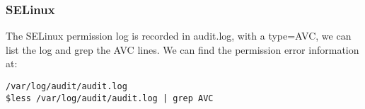 \subsubsection{SELinux}
The SELinux permission log is recorded in audit.log, with a type=AVC, we can list the log and grep the AVC lines.
We can find the permission error information at:
\begin{lstlisting}
/var/log/audit/audit.log
$less /var/log/audit/audit.log | grep AVC
\end{lstlisting}




